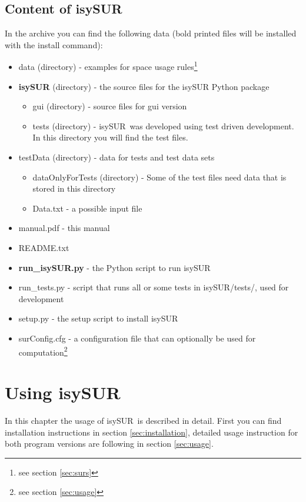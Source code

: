 \documentclass[11pt,fleqn]{book} %
\newcommand{\todol}{\todo[inline]} %
\newcommand{\ProjectTitle}{isySUR}
\newcommand{\pt}{\ProjectTitle}
\begin{document}
\section{Content of \ProjectTitle}
\todol{add pydoc file}
In the archive you can find the following data (bold printed files will be installed with the install command):
\begin{itemize}
	\item data (directory) - examples for space usage rules\footnote{see section \ref{sec:surs}}
	\item \textbf{isySUR} (directory) - the source files for the isySUR Python package
	\begin{itemize}
		\item gui (directory) - source files for gui version
		\item tests (directory) - \pt\ was developed using test driven development. In this directory you will find the test files.
	\end{itemize}
	\item testData (directory) - data for tests and test data sets
	\begin{itemize}
		\item dataOnlyForTests (directory) - Some of the test files need data that is stored in this directory
		\item Data.txt - a possible input file
	\end{itemize}
	\item manual.pdf - this manual
	\item README.txt
	\item \textbf{run\_isySUR.py} - the Python script to run \pt
	\item run\_tests.py - script that runs all or some tests in isySUR/tests/, used for development
	\item setup.py - the setup script to install \pt
	\item surConfig.cfg - a configuration file that can optionally be used for computation\footnote{see section \ref{sec:usage}}
\end{itemize}



\chapter{Using \ProjectTitle}
In this chapter the usage of \pt\ is described in detail. First you can find installation instructions in section \ref{sec:installation}, detailed usage instruction for both program versions are following in section \ref{sec:usage}.
\end{document}
